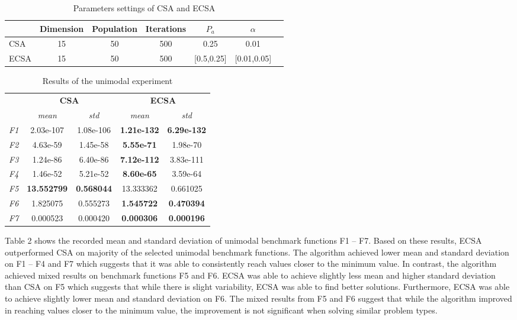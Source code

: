 \documentclass{article}
\begin{document}
\begin{table}[htbp]
    \centering
    \begin{tabular}{lcccccc}
        \toprule
        & \textbf{Dimension} & \textbf{Population} & \textbf{Iterations} & $P_a$ & $\alpha$ \\
        \midrule
        CSA  & 15 & 50 & 500 & 0.25 & 0.01 \\
        ECSA & 15 & 50 & 500 & [0.5,0.25] & [0.01,0.05] \\
        \bottomrule
    \end{tabular}
    \caption{Parameters settings of CSA and ECSA}
    \label{tab:parameters}
\end{table}

\begin{table}[htbp]
    \centering
    \begin{tabular}{lcc|cc}
        \toprule
        & \multicolumn{2}{c}{\textbf{CSA}} & \multicolumn{2}{c}{\textbf{ECSA}} \\ 
        \cmidrule(lr){2-3} \cmidrule(lr){4-5}
        & \textit{mean} & \textit{std} & \textit{mean} & \textit{std} \\ 
        \midrule
        \textit{F1}  & 2.03e-107  & 1.08e-106  & \textbf{1.21e-132}  & \textbf{6.29e-132}  \\ 
        \textit{F2}  & 4.63e-59  & 1.45e-58  & \textbf{5.55e-71}  & 1.98e-70  \\ 
        \textit{F3}  & 1.24e-86  & 6.40e-86  & \textbf{7.12e-112}  & 3.83e-111  \\ 
        \textit{F4}  & 1.46e-52  & 5.21e-52  & \textbf{8.60e-65}  & 3.59e-64  \\ 
        \textit{F5}  & \textbf{13.552799} & \textbf{0.568044} & 13.333362 & 0.661025 \\ 
        \textit{F6}  & 1.825075  & 0.555273  & \textbf{1.545722}  & \textbf{0.470394}  \\ 
        \textit{F7}  & 0.000523  & 0.000420  & \textbf{0.000306}  & \textbf{0.000196}  \\ 
        \bottomrule
    \end{tabular}
    \caption{Results of the unimodal experiment}
    \label{tab:unimodal}
\end{table}

Table 2 shows the recorded mean and standard deviation of unimodal benchmark functions F1 – F7. Based on these results, ECSA outperformed CSA on majority of the selected unimodal benchmark functions. The algorithm achieved lower mean and standard deviation on F1 – F4 and F7 which suggests that it was able to consistently reach values closer to the minimum value. In contrast, the algorithm achieved mixed results on benchmark functions F5 and F6. ECSA was able to achieve slightly less mean and higher standard deviation than CSA on F5 which suggests that while there is slight variability, ECSA was able to find better solutions. Furthermore, ECSA was able to achieve slightly lower mean and standard deviation on F6. The mixed results from F5 and F6 suggest that while the algorithm improved in reaching values closer to the minimum value, the improvement is not significant when solving similar problem types.
\end{document}
